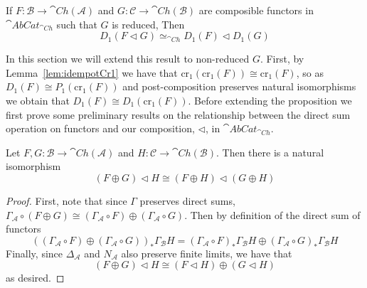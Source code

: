 \begin{prop}[label=prop:5.7]
    If $F:\mathcal{B}\to \cat{Ch}(\mathcal{A})$ and $G:\mathcal{C}\to \cat{Ch}(\mathcal{B})$ are composible functors in $\cat{AbCat}_{\cat{Ch}}$ such that $G$ is reduced, Then
    \begin{equation*}
        D_1(F\lhd G) \simeq_{\cat{Ch}} D_1(F)\lhd D_1(G)
    \end{equation*}
\end{prop}

In this section we will extend this result to non-reduced $G$. First, by Lemma~\ref{lem:idempotCr1} we have that $\text{cr}_1(\text{cr}_1(F))\cong \text{cr}_1(F)$, so as $D_1(F) \cong P_1(\text{cr}_1(F))$ and post-composition preserves natural isomorphisms we obtain that $D_1(F) \cong D_1(\text{cr}_1(F))$. Before extending the proposition we first prove some preliminary results on the relationship between the direct sum operation on functors and our composition, $\lhd$, in $\cat{AbCat}_{\cat{Ch}}$. 

\begin{lem}[label=lem:compDirSum]
    Let $F,G:\mathcal{B}\to \cat{Ch}(\mathcal{A})$ and $H:\mathcal{C}\to \cat{Ch}(\mathcal{B})$. Then there is a natural isomorphism
    \begin{equation*}
        (F\oplus G)\lhd H\cong (F\oplus H)\lhd (G\oplus H)
    \end{equation*}
\end{lem}
\begin{proof}
    First, note that since $\Gamma$ preserves direct sums, $\Gamma_\mathcal{A}\circ (F\oplus G)\cong (\Gamma_\mathcal{A}\circ F)\oplus (\Gamma_\mathcal{A}\circ G)$. Then by definition of the direct sum of functors
    \begin{equation*}
        ((\Gamma_\mathcal{A}\circ F)\oplus (\Gamma_\mathcal{A}\circ G))_*\Gamma_\mathcal{B}H = (\Gamma_\mathcal{A}\circ F)_*\Gamma_\mathcal{B}H\oplus (\Gamma_\mathcal{A}\circ G)_*\Gamma_\mathcal{B}H
    \end{equation*}
    Finally, since $\Delta_\mathcal{A}$ and $N_\mathcal{A}$ also preserve finite limits, we have that 
    \begin{equation*}
        (F\oplus G)\lhd H \cong (F\lhd H)\oplus (G\lhd H)
    \end{equation*}
    as desired.
\end{proof}

